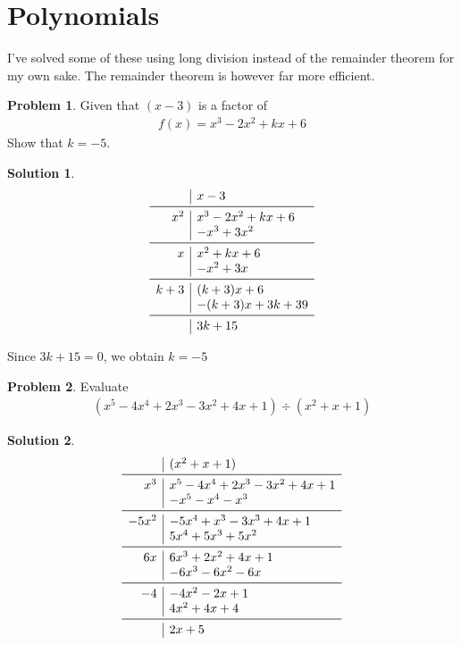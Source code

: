 \documentclass[a4paper]{article}
\theoremstyle{definition}
\newtheorem{problem}{Problem}[section]
\newtheorem*{solution}{Solution}
\begin{document}
\section{Polynomials}
I've solved some of these using long division instead of the remainder theorem for my own sake. The remainder theorem is however far more efficient.
\begin{problem}
Given that \((x-3)\) is a factor of 
\begin{align*}
f(x) = x^3 - 2x^2 + kx +6
\end{align*}
Show that \(k=-5\).
\end{problem}
\begin{solution}
\[
\begin{array}{r|l}
& x-3 \\
\midrule
x^2 & x^3 -2x^2 +kx +6 \\
& -x^3 +3x^2 \\
\midrule
x & x^2 +kx +6 \\
& -x^2 + 3x \\
\midrule
k+3 & (k+3)x +6 \\
& -(k+3)x +3k+39\\
\midrule
& 3k+15
\end{array}
\]

Since \(3k+15 = 0\), we obtain \(k=-5\)
\end{solution}

\begin{problem}
Evaluate
\begin{align*}
(x^5 -4x^4 +2x^3 -3x^2 +4x +1) \div (x^2 +x +1)
\end{align*}
\end{problem}

\begin{solution}
\[
\begin{array}{r|l}
& (x^2 + x + 1) \\
\midrule
x^3 & x^5- 4x^4 + 2x^3 -3x^2 +4x +1   \\
& -x^5 -x^4 -x^3 \\
\midrule
-5x^2 & -5x^4 +x^3 -3x^3 +4x +1 \\
&5x^4 + 5x^3 + 5x^2 \\
\midrule
6x & 6x^3 +2x^2 +4x +1 \\
& -6x^3 -6x^2 -6x \\
\midrule
-4 & -4x^2 -2x +1 \\
& 4x^2 +4x +4 \\
\midrule
& 2x + 5
\end{array}
\]
\end{solution}
\end{document}
